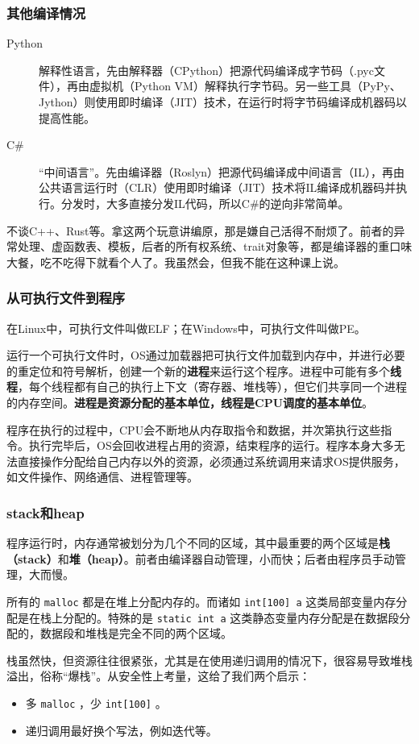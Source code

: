\documentclass[fontset=none,aspectratio=1610]{ctexbeamer}
\begin{document}
\begin{frame}
    \frametitle{其他编译情况}

    \begin{description}
        \item[Python] 解释性语言，先由解释器（CPython）把源代码编译成字节码（.pyc文件），再由虚拟机（Python VM）解释执行字节码。另一些工具（PyPy、Jython）则使用即时编译（JIT）技术，在运行时将字节码编译成机器码以提高性能。
        \item[C\#] “中间语言”。先由编译器（Roslyn）把源代码编译成中间语言（IL），再由公共语言运行时（CLR）使用即时编译（JIT）技术将IL编译成机器码并执行。分发时，大多直接分发IL代码，所以C\#的逆向非常简单。
    \end{description}

    不谈C++、Rust等。拿这两个玩意讲编原，那是嫌自己活得不耐烦了。前者的异常处理、虚函数表、模板，后者的所有权系统、trait对象等，都是编译器的重口味大餐，吃不吃得下就看个人了。我虽然会，但我不能在这种课上说。

\end{frame}

\begin{frame}
    \frametitle{从可执行文件到程序}

    在Linux中，可执行文件叫做ELF；在Windows中，可执行文件叫做PE。

    运行一个可执行文件时，OS通过加载器把可执行文件加载到内存中，并进行必要的重定位和符号解析，创建一个新的\textbf{进程}来运行这个程序。进程中可能有多个\textbf{线程}，每个线程都有自己的执行上下文（寄存器、堆栈等），但它们共享同一个进程的内存空间。\textbf{进程是资源分配的基本单位，线程是CPU调度的基本单位}。

    程序在执行的过程中，CPU会不断地从内存取指令和数据，并次第执行这些指令。执行完毕后，OS会回收进程占用的资源，结束程序的运行。程序本身大多无法直接操作分配给自己内存以外的资源，必须通过系统调用来请求OS提供服务，如文件操作、网络通信、进程管理等。

\end{frame}

\begin{frame}
    \frametitle{stack和heap}

    程序运行时，内存通常被划分为几个不同的区域，其中最重要的两个区域是\textbf{栈（stack）}和\textbf{堆（heap）}。前者由编译器自动管理，小而快；后者由程序员手动管理，大而慢。

    所有的 \texttt{malloc} 都是在堆上分配内存的。而诸如 \texttt{int[100] a} 这类局部变量内存分配是在栈上分配的。特殊的是 \texttt{static int a} 这类静态变量内存分配是在数据段分配的，数据段和堆栈是完全不同的两个区域。

    栈虽然快，但资源往往很紧张，尤其是在使用递归调用的情况下，很容易导致堆栈溢出，俗称“爆栈”。从安全性上考量，这给了我们两个启示：
    \begin{itemize}
        \item 多 \texttt{malloc} ，少 \texttt{int[100]} 。
        \item 递归调用最好换个写法，例如迭代等。
    \end{itemize}

\end{frame}
\end{document}
